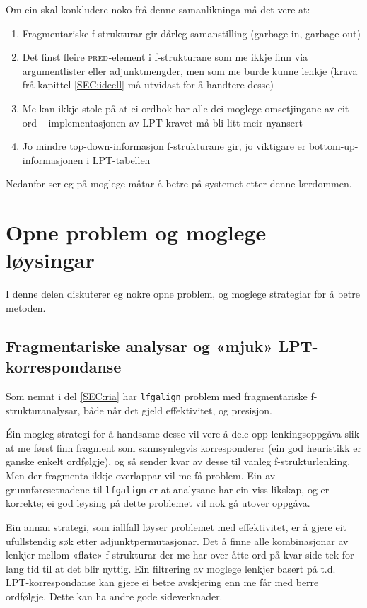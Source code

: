 \documentclass[12pt,a4paper,oneside,draft]{report}
\newcommand{\F}[2]{\textsc{#1}\ensuremath{_{#2}}}
\newcommand{\PRED}{\F{pred}{}}
\begin{document}
Om ein skal konkludere noko frå denne samanlikninga må det vere at:
\begin{enumerate}
\item Fragmentariske f\hyp{}strukturar gir dårleg samanstilling (garbage in,
   garbage out)
\item Det finst fleire \PRED{}-element i f\hyp{}strukturane som me ikkje finn
   via argumentlister eller adjunktmengder, men som me burde kunne
   lenkje (krava frå kapittel \ref{SEC:ideell} må utvidast for å
   handtere desse)
\item Me kan ikkje stole på at ei ordbok har alle dei moglege
   omsetjingane av eit ord -- implementasjonen av LPT-kravet må
   bli litt meir nyansert
\item Jo mindre top-down-informasjon f\hyp{}strukturane gir, jo viktigare er
   bottom-up-informasjonen i LPT-tabellen
\end{enumerate}
Nedanfor ser eg på moglege måtar å betre på systemet etter denne
lærdommen.

\section{Opne problem og moglege løysingar}
\label{sec-5.4}

   \label{SEC:opneproblem}

I denne delen diskuterer eg nokre opne problem, og moglege strategiar
for å betre metoden.

\subsection{Fragmentariske analysar og «mjuk» LPT\hyp{}korrespondanse}
\label{sec-5.4.1}

Som nemnt i del \ref{SEC:ria} har \texttt{lfgalign} problem med
 fragmentariske f\hyp{}strukturanalysar, både når det gjeld effektivitet,
 og presisjon.

Éin mogleg strategi for å handsame desse vil vere å dele opp
 lenkingsoppgåva slik at me først finn fragment som sannsynlegvis
 korresponderer (ein god heuristikk er ganske enkelt ordfølgje), og så
 sender kvar av desse til vanleg f\hyp{}strukturlenking. Men der fragmenta
 ikkje overlappar vil me få problem. Ein av grunnføresetnadene til
 \texttt{lfgalign} er at analysane har ein viss likskap, og er korrekte; ei
 god løysing på dette problemet vil nok gå utover oppgåva.

Ein annan strategi, som iallfall løyser problemet med effektivitet, er
 å gjere eit ufullstendig søk etter adjunktpermutasjonar. Det å finne
 alle kombinasjonar av lenkjer mellom «flate» f\hyp{}strukturar der me har
 over åtte ord på kvar side tek for lang tid til at det blir
 nyttig. Ein filtrering av moglege lenkjer basert på
 t.d. LPT\hyp{}korrespondanse kan gjere ei betre avskjering enn me får med
 berre ordfølgje. Dette kan ha andre gode sideverknader.
\end{document}
